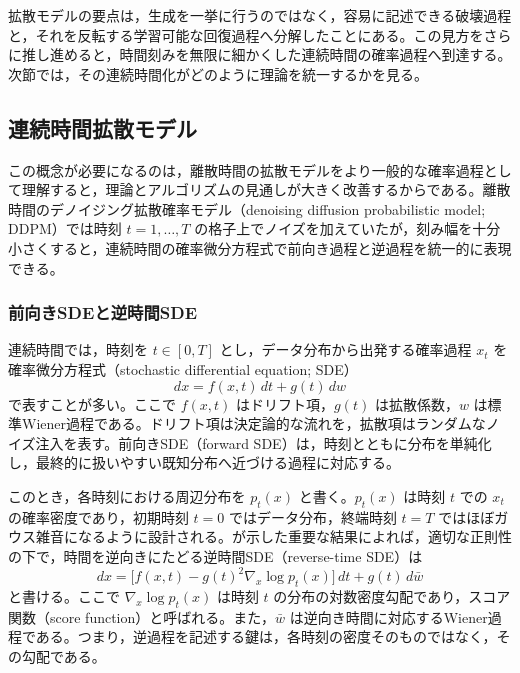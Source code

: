 拡散モデルの要点は，生成を一挙に行うのではなく，容易に記述できる破壊過程と，それを反転する学習可能な回復過程へ分解したことにある。この見方をさらに推し進めると，時間刻みを無限に細かくした連続時間の確率過程へ到達する。次節では，その連続時間化がどのように理論を統一するかを見る。

\subsection{連続時間拡散モデル}

この概念が必要になるのは，離散時間の拡散モデルをより一般的な確率過程として理解すると，理論とアルゴリズムの見通しが大きく改善するからである。離散時間のデノイジング拡散確率モデル（denoising diffusion probabilistic model; DDPM）では時刻 \(t=1,\dots,T\) の格子上でノイズを加えていたが，刻み幅を十分小さくすると，連続時間の確率微分方程式で前向き過程と逆過程を統一的に表現できる。

\subsubsection{前向きSDEと逆時間SDE}

連続時間では，時刻を \(t \in [0,T]\) とし，データ分布から出発する確率過程 \(x_t\) を確率微分方程式（stochastic differential equation; SDE）
\begin{equation}
dx = f(x,t)\,dt + g(t)\,d w
\end{equation}
で表すことが多い。ここで \(f(x,t)\) はドリフト項，\(g(t)\) は拡散係数，\(w\) は標準Wiener過程である。ドリフト項は決定論的な流れを，拡散項はランダムなノイズ注入を表す。前向きSDE（forward SDE）は，時刻とともに分布を単純化し，最終的に扱いやすい既知分布へ近づける過程に対応する。

このとき，各時刻における周辺分布を \(p_t(x)\) と書く。\(p_t(x)\) は時刻 \(t\) での \(x_t\) の確率密度であり，初期時刻 \(t=0\) ではデータ分布，終端時刻 \(t=T\) ではほぼガウス雑音になるように設計される。\citet{Song2021}が示した重要な結果によれば，適切な正則性の下で，時間を逆向きにたどる逆時間SDE（reverse-time SDE）は
\begin{equation}
dx=
\bigl[f(x,t)-g(t)^2\nabla_x \log p_t(x)\bigr]\,dt
+ g(t)\,d\bar{w}
\end{equation}
と書ける。ここで \(\nabla_x \log p_t(x)\) は時刻 \(t\) の分布の対数密度勾配であり，スコア関数（score function）と呼ばれる。また，\(\bar{w}\) は逆向き時間に対応するWiener過程である。つまり，逆過程を記述する鍵は，各時刻の密度そのものではなく，その勾配である。


